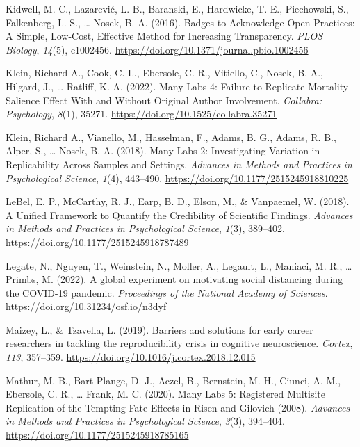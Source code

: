 \documentclass[
  man,floatsintext]{apa6}
\newlength{\cslhangindent}
\newlength{\cslentryspacingunit} %
\newenvironment{CSLReferences}[2] %
 {%
  \setlength{\parindent}{0pt}
  \ifodd #1
  \let\oldpar\par
  \def\par{\hangindent=\cslhangindent\oldpar}
  \fi
  \setlength{\parskip}{#2\cslentryspacingunit}
 }%
 {}
\begin{document}
\begin{CSLReferences}{1}{0}
\leavevmode{}%
Kidwell, M. C., Lazarević, L. B., Baranski, E., Hardwicke, T. E., Piechowski, S., Falkenberg, L.-S., \ldots{} Nosek, B. A. (2016). Badges to Acknowledge Open Practices: A Simple, Low-Cost, Effective Method for Increasing Transparency. \emph{PLOS Biology}, \emph{14}(5), e1002456. \url{https://doi.org/10.1371/journal.pbio.1002456}

\leavevmode{}%
Klein, Richard A., Cook, C. L., Ebersole, C. R., Vitiello, C., Nosek, B. A., Hilgard, J., \ldots{} Ratliff, K. A. (2022). Many Labs 4: Failure to Replicate Mortality Salience Effect With and Without Original Author Involvement. \emph{Collabra: Psychology}, \emph{8}(1), 35271. \url{https://doi.org/10.1525/collabra.35271}

\leavevmode{}%
Klein, Richard A., Vianello, M., Hasselman, F., Adams, B. G., Adams, R. B., Alper, S., \ldots{} Nosek, B. A. (2018). Many Labs 2: Investigating Variation in Replicability Across Samples and Settings. \emph{Advances in Methods and Practices in Psychological Science}, \emph{1}(4), 443--490. \url{https://doi.org/10.1177/2515245918810225}

\leavevmode{}%
LeBel, E. P., McCarthy, R. J., Earp, B. D., Elson, M., \& Vanpaemel, W. (2018). A Unified Framework to Quantify the Credibility of Scientific Findings. \emph{Advances in Methods and Practices in Psychological Science}, \emph{1}(3), 389--402. \url{https://doi.org/10.1177/2515245918787489}

\leavevmode{}%
Legate, N., Nguyen, T., Weinstein, N., Moller, A., Legault, L., Maniaci, M. R., \ldots{} Primbs, M. (2022). A global experiment on motivating social distancing during the COVID-19 pandemic. \emph{Proceedings of the National Academy of Sciences}. \url{https://doi.org/10.31234/osf.io/n3dyf}

\leavevmode{}%
Maizey, L., \& Tzavella, L. (2019). Barriers and solutions for early career researchers in tackling the reproducibility crisis in cognitive neuroscience. \emph{Cortex}, \emph{113}, 357--359. \url{https://doi.org/10.1016/j.cortex.2018.12.015}

\leavevmode{}%
Mathur, M. B., Bart-Plange, D.-J., Aczel, B., Bernstein, M. H., Ciunci, A. M., Ebersole, C. R., \ldots{} Frank, M. C. (2020). Many Labs 5: Registered Multisite Replication of the Tempting-Fate Effects in Risen and Gilovich (2008). \emph{Advances in Methods and Practices in Psychological Science}, \emph{3}(3), 394--404. \url{https://doi.org/10.1177/2515245918785165}


\end{CSLReferences}
\end{document}
